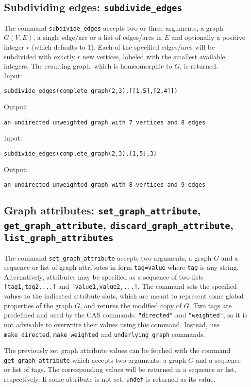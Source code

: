 \documentclass[a4paper,11pt]{article}
\begin{document}
\subsection{Subdividing edges: {\tt subdivide\_edges}}

The command {\tt subdivide\_edges} accepts two or three arguments, a graph $ G(V,E) $, a single edge/arc or a list of edges/arcs in $ E $ and optionally a positive integer $ r $ (which defaults to 1). Each of the specified edges/arcs will be subdivided with exactly $ r $ new vertices, labeled with the smallest available integers. The resulting graph, which is homeomorphic to $ G $, is returned.\\
Input:
\begin{center}
  \tt subdivide\_edges(complete\_graph(2,3),[[1,5],[2,4]])
\end{center}
Output:
\begin{center}
  \tt an undirected unweighted graph with 7 vertices and 8 edges
\end{center}
Input:
\begin{center}
  \tt subdivide\_edges(complete\_graph(2,3),[1,5],3)
\end{center}
Output:
\begin{center}
  \tt an undirected unweighted graph with 8 vertices and 9 edges
\end{center}

\subsection{Graph attributes: {\tt set\_graph\_attribute}, {\tt get\_graph\_attribute}, {\tt discard\_graph\_attribute}, {\tt list\_graph\_attributes}}

The command {\tt set\_graph\_attribute} accepts two arguments, a graph $ G $ and a sequence or list of graph attributes in form {\tt tag=value} where {\tt tag} is any string. Alternatively, attributes may be specified as a sequence of two lists {\tt [tag1,tag2,...]} and {\tt [value1,value2,...]}. The command sets the specified values to the indicated attribute slots, which are meant to represent some global properties of the graph $ G $, and returns the modified copy of $ G $. Two tags are predefined and used by the CAS commands: {\tt "directed"} and {\tt "weighted"}, so it is not advisable to overwrite their values using this command. Instead, use {\tt make\_directed}, {\tt make\_weighted} and {\tt underlying\_graph} commands.

The previously set graph attribute values can be fetched with the command {\tt get\_graph\_attribute} which accepts two arguments: a graph $ G $ and a sequence or list of tags. The corresponding values will be returned in a sequence or list, respectively. If some attribute is not set, {\tt undef} is returned as its value.
\end{document}
